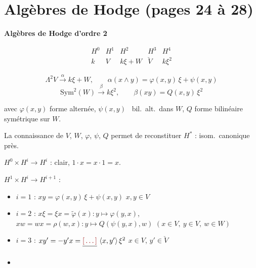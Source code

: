 \documentclass[11pt,a4paper]{article}
\begin{document}

\section*{Algèbres de Hodge (pages 24 à 28)}


\textbf{Algèbres de Hodge d'ordre 2}

\[
\begin{array}{ccccc}
H^{0} & H^{1} & H^{2} & H^{3} & H^{4} \\
k & V & k\xi + W & \check{V} & k\xi^{2}
\end{array}
\]

\[
\Lambda^{2}V \xrightarrow{\ \alpha\ } k\xi + W, \qquad
\alpha(x \wedge y) = \varphi(x,y)\,\xi + \psi(x,y)
\]
\[
\mathrm{Sym}^{2}(W) \xrightarrow{\ \beta\ } k\xi^{2}, \qquad
\beta(xy) = Q(x,y)\,\xi^{2}
\]

avec $\varphi(x,y)$ forme alternée, $\psi(x,y)$ \ bil.\ alt.\
dans $W$, $Q$ forme bilinéaire symétrique sur $W$.

\struck{\ill{}} La connaissance de $V$, $W$, $\varphi$, $\psi$, $Q$ permet de
reconstituer $H^{*}$ : \add{à} isom.\ canonique près.


$H^{0} \times H^{i} \to H^{i}$ : clair,  $1 \cdot x = x \cdot 1 = x$.

$H^{1} \times H^{i} \to H^{i+1}$ :
\begin{itemize}
\item {} $i = 1$ : $xy = \varphi(x,y)\,\xi + \psi(x,y)$ \quad $x, y \in V$
\item $i = 2$ : $x\xi = \xi x = \tilde\varphi(x) : y \mapsto \varphi(y,x)$, \quad
      $xw = wx = \rho(w,x) : y \mapsto Q(\psi(y,x), w)$ \quad $(x \in V,\ y \in V,\ w \in W)$
\item $i = 3$ : $xy' = -y'x = \struck{\ill{}}\ \langle x, y'\rangle\,\xi^{2}$
      \quad $x \in V$, $y' \in \check{V}$
\item {} \struck{\ill{}}
\end{itemize}
\end{document}
